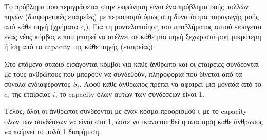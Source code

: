 \documentclass[a4paper,oneside, 11pt]{article}
\begin{document}
Το πρόβλημα που περιγράφεται στην εκφώνηση είναι ένα πρόβλημα ροής πολλών πηγών (διαφορετικές εταιρείες) με περιορισμό όμως στη δυνατότητα παραγωγής ροής από κάθε πηγή (χρήματα $c_i$). Για τη μοντελοποίηση του προβλήματος αυτού εισάγεται ένας νέος κόμβος s που μπορεί να στέλνει σε κάθε μία πηγή ξεχωριστά ροή μικρότερη ή ίση από το capacity της κάθε πηγής (εταιρείας). \bigbreak 

Στο επόμενο στάδιο εισάγονται κόμβοι για κάθε άνθρωπο και οι εταιρείες συνδέονται με τους ανθρώπους που μπορούν να συνδεθούν, πληροφορία που δίνεται από τα σύνολα ενδιαφέροντος $S_i$. Αφού κάθε άνθρωπος πρέπει να αφαιρεί μια μονάδα από το $c_i$ της εταιρείας $i$, το capacity όλων αυτών των συνδέσεων είναι 1. \bigbreak 


Τέλος, όλοι οι άνθρωποι συνδέονται με έναν κόσμο προορισμού t με το capacity όλων των συνδέσεων να είναι στο 1, ώστε να ικανοποιηθεί η απαίτηση κάθε άνθρωπος να παίρνει το πολύ 1 διαφήμιση. \bigbreak 
\end{document}
